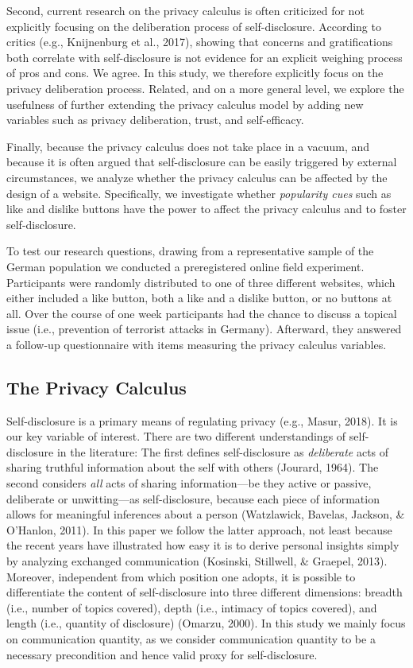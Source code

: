 \documentclass[
  english,
  man,floatsintext]{apa6}
\begin{document}
Second, current research on the privacy calculus is often criticized for not explicitly focusing on the deliberation process of self-disclosure.
According to critics (e.g., Knijnenburg et al., 2017), showing that concerns and gratifications both correlate with self-disclosure is not evidence for an explicit weighing process of pros and cons.
We agree.
In this study, we therefore explicitly focus on the privacy deliberation process.
Related, and on a more general level, we explore the usefulness of further extending the privacy calculus model by adding new variables such as privacy deliberation, trust, and self-efficacy.

Finally, because the privacy calculus does not take place in a vacuum, and because it is often argued that self-disclosure can be easily triggered by external circumstances, we analyze whether the privacy calculus can be affected by the design of a website.
Specifically, we investigate whether \emph{popularity cues} such as like and dislike buttons have the power to affect the privacy calculus and to foster self-disclosure.

To test our research questions, drawing from a representative sample of the German population we conducted a preregistered online field experiment.
Participants were randomly distributed to one of three different websites, which either included a like button, both a like and a dislike button, or no buttons at all.
Over the course of one week participants had the chance to discuss a topical issue (i.e., prevention of terrorist attacks in Germany).
Afterward, they answered a follow-up questionnaire with items measuring the privacy calculus variables.

\hypertarget{the-privacy-calculus}{%
\subsection{The Privacy Calculus}\label{the-privacy-calculus}}

Self-disclosure is a primary means of regulating privacy (e.g., Masur, 2018).
It is our key variable of interest.
There are two different understandings of self-disclosure in the literature:
The first defines self-disclosure as \emph{deliberate} acts of sharing truthful information about the self with others (Jourard, 1964).
The second considers \emph{all} acts of sharing information---be they active or passive, deliberate or unwitting---as self-disclosure, because each piece of information allows for meaningful inferences about a person (Watzlawick, Bavelas, Jackson, \& O'Hanlon, 2011).
In this paper we follow the latter approach, not least because the recent years have illustrated how easy it is to derive personal insights simply by analyzing exchanged communication (Kosinski, Stillwell, \& Graepel, 2013).
Moreover, independent from which position one adopts, it is possible to differentiate the content of self-disclosure into three different dimensions: breadth (i.e., number of topics covered), depth (i.e., intimacy of topics covered), and length (i.e., quantity of disclosure) (Omarzu, 2000).
In this study we mainly focus on communication quantity, as we consider communication quantity to be a necessary precondition and hence valid proxy for self-disclosure.
\end{document}
